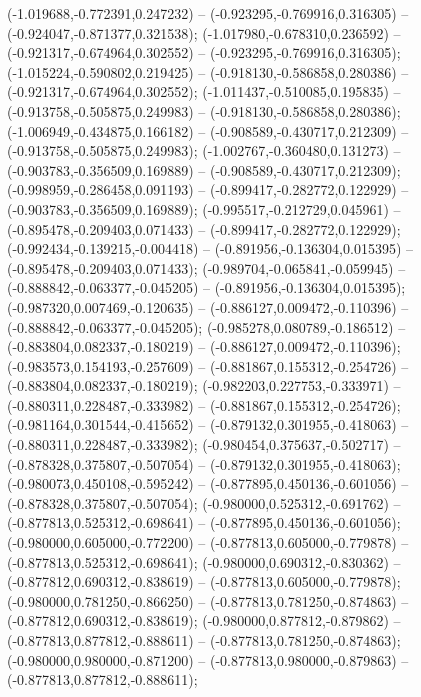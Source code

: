  (-1.019688,-0.772391,0.247232) -- (-0.923295,-0.769916,0.316305) -- (-0.924047,-0.871377,0.321538);
 (-1.017980,-0.678310,0.236592) -- (-0.921317,-0.674964,0.302552) -- (-0.923295,-0.769916,0.316305);
 (-1.015224,-0.590802,0.219425) -- (-0.918130,-0.586858,0.280386) -- (-0.921317,-0.674964,0.302552);
 (-1.011437,-0.510085,0.195835) -- (-0.913758,-0.505875,0.249983) -- (-0.918130,-0.586858,0.280386);
 (-1.006949,-0.434875,0.166182) -- (-0.908589,-0.430717,0.212309) -- (-0.913758,-0.505875,0.249983);
 (-1.002767,-0.360480,0.131273) -- (-0.903783,-0.356509,0.169889) -- (-0.908589,-0.430717,0.212309);
 (-0.998959,-0.286458,0.091193) -- (-0.899417,-0.282772,0.122929) -- (-0.903783,-0.356509,0.169889);
 (-0.995517,-0.212729,0.045961) -- (-0.895478,-0.209403,0.071433) -- (-0.899417,-0.282772,0.122929);
 (-0.992434,-0.139215,-0.004418) -- (-0.891956,-0.136304,0.015395) -- (-0.895478,-0.209403,0.071433);
 (-0.989704,-0.065841,-0.059945) -- (-0.888842,-0.063377,-0.045205) -- (-0.891956,-0.136304,0.015395);
 (-0.987320,0.007469,-0.120635) -- (-0.886127,0.009472,-0.110396) -- (-0.888842,-0.063377,-0.045205);
 (-0.985278,0.080789,-0.186512) -- (-0.883804,0.082337,-0.180219) -- (-0.886127,0.009472,-0.110396);
 (-0.983573,0.154193,-0.257609) -- (-0.881867,0.155312,-0.254726) -- (-0.883804,0.082337,-0.180219);
 (-0.982203,0.227753,-0.333971) -- (-0.880311,0.228487,-0.333982) -- (-0.881867,0.155312,-0.254726);
 (-0.981164,0.301544,-0.415652) -- (-0.879132,0.301955,-0.418063) -- (-0.880311,0.228487,-0.333982);
 (-0.980454,0.375637,-0.502717) -- (-0.878328,0.375807,-0.507054) -- (-0.879132,0.301955,-0.418063);
 (-0.980073,0.450108,-0.595242) -- (-0.877895,0.450136,-0.601056) -- (-0.878328,0.375807,-0.507054);
 (-0.980000,0.525312,-0.691762) -- (-0.877813,0.525312,-0.698641) -- (-0.877895,0.450136,-0.601056);
 (-0.980000,0.605000,-0.772200) -- (-0.877813,0.605000,-0.779878) -- (-0.877813,0.525312,-0.698641);
 (-0.980000,0.690312,-0.830362) -- (-0.877812,0.690312,-0.838619) -- (-0.877813,0.605000,-0.779878);
 (-0.980000,0.781250,-0.866250) -- (-0.877813,0.781250,-0.874863) -- (-0.877812,0.690312,-0.838619);
 (-0.980000,0.877812,-0.879862) -- (-0.877813,0.877812,-0.888611) -- (-0.877813,0.781250,-0.874863);
 (-0.980000,0.980000,-0.871200) -- (-0.877813,0.980000,-0.879863) -- (-0.877813,0.877812,-0.888611);
